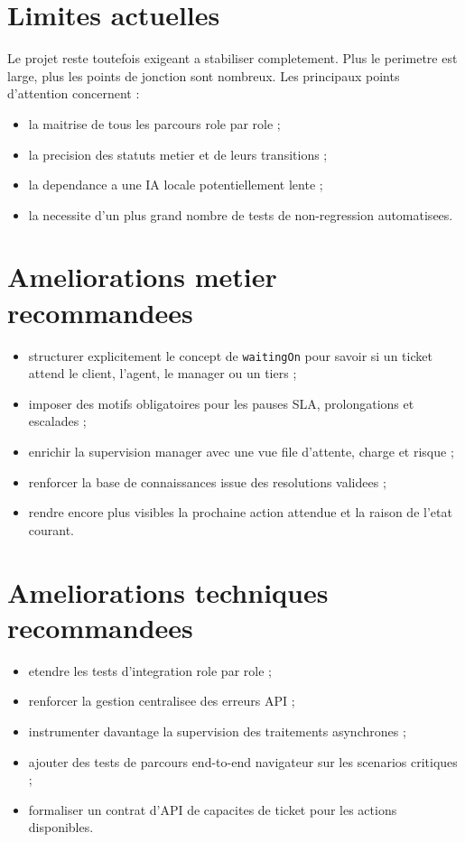 \documentclass[12pt,a4paper,oneside]{report}
\begin{document}
\section{Limites actuelles}

Le projet reste toutefois exigeant a stabiliser completement. Plus le perimetre est large, plus les points de jonction sont nombreux. Les principaux points d'attention concernent :

\begin{itemize}[leftmargin=1.2cm]
  \item la maitrise de tous les parcours role par role ;
  \item la precision des statuts metier et de leurs transitions ;
  \item la dependance a une IA locale potentiellement lente ;
  \item la necessite d'un plus grand nombre de tests de non-regression automatisees.
\end{itemize}

\section{Ameliorations metier recommandees}

\begin{itemize}[leftmargin=1.2cm]
  \item structurer explicitement le concept de \texttt{waitingOn} pour savoir si un ticket attend le client, l'agent, le manager ou un tiers ;
  \item imposer des motifs obligatoires pour les pauses SLA, prolongations et escalades ;
  \item enrichir la supervision manager avec une vue file d'attente, charge et risque ;
  \item renforcer la base de connaissances issue des resolutions validees ;
  \item rendre encore plus visibles la prochaine action attendue et la raison de l'etat courant.
\end{itemize}

\section{Ameliorations techniques recommandees}

\begin{itemize}[leftmargin=1.2cm]
  \item etendre les tests d'integration role par role ;
  \item renforcer la gestion centralisee des erreurs API ;
  \item instrumenter davantage la supervision des traitements asynchrones ;
  \item ajouter des tests de parcours end-to-end navigateur sur les scenarios critiques ;
  \item formaliser un contrat d'API de capacites de ticket pour les actions disponibles.
\end{itemize}
\end{document}

